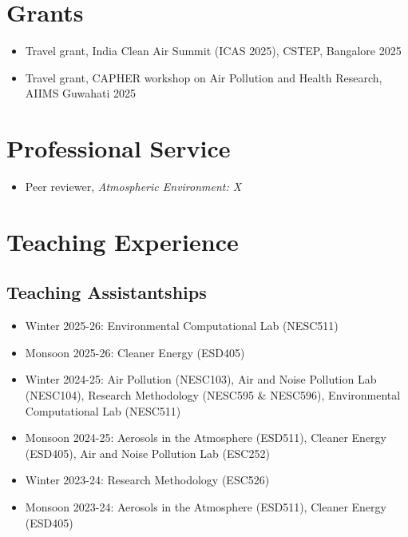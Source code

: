 \documentclass[11pt, a4paper]{article}
\begin{document}
\section*{Grants}
\begin{itemize}[leftmargin=*]
  \item Travel grant, India Clean Air Summit (ICAS 2025), CSTEP, Bangalore \hfill 2025
  \item Travel grant, CAPHER workshop on Air Pollution and Health Research,
  AIIMS Guwahati \hfill 2025
\end{itemize}

\section*{Professional Service}
\begin{itemize}[leftmargin=*]
  \item Peer reviewer, \textit{Atmospheric Environment: X}
\end{itemize}

\section*{Teaching Experience}
\subsection*{Teaching Assistantships}
\begin{itemize}[leftmargin=*,noitemsep]
  \item Winter 2025-26: Environmental Computational Lab (NESC511)
  \item Monsoon 2025-26: Cleaner Energy (ESD405)
  \item Winter 2024-25: Air Pollution (NESC103), Air and Noise Pollution Lab (NESC104),
  Research Methodology (NESC595 \& NESC596), Environmental Computational Lab (NESC511)
  \item Monsoon 2024-25: Aerosols in the Atmosphere (ESD511), Cleaner Energy (ESD405),
  Air and Noise Pollution Lab (ESC252)
  \item Winter 2023-24: Research Methodology (ESC526)
  \item Monsoon 2023-24: Aerosols in the Atmosphere (ESD511), Cleaner Energy (ESD405)
\end{itemize}
\end{document}
